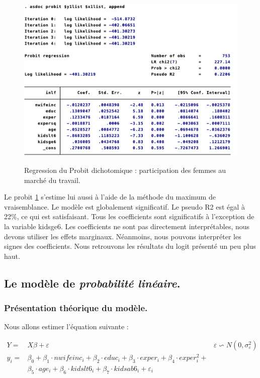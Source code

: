  \begin{figure}[h]
    \caption{Regression du Probit dichotomique : participation des femmes au marché du travail.}
    \includegraphics[scale = 0.8]{100_tab_results/probitdicho.png}
    \centering
    \label{reg:Probitdichotomique}
\end{figure}

 Le probit \ref{reg:Probitdichotomique} s’estime lui aussi à l’aide de la méthode du maximum de vraisemblance. Le modèle est globalement significatif. Le pseudo R2 est égal à 22\%, ce qui est satisfaisant. Tous les coefficients sont significatifs à l’exception de la variable kidsge6. Les coefficients ne sont pas directement interprétables, nous devons utiliser les effets marginaux. Néanmoins, nous pouvons interpréter les signes des coefficients. Nous retrouvons les résultats du logit présenté un peu plus haut.

 \subsection*{Le modèle de \emph{probabilité linéaire}.}

 \subsubsection*{Présentation théorique du modèle.}

 Nous allons estimer l'équation suivante : 
 
 \begin{align*}
     Y = & X \beta + \varepsilon  &  \varepsilon \backsim N(0,\sigma^2_{\varepsilon})  \nonumber \\
     y_i  = & \beta_0 + \beta_1 \cdot nwifeinc_i + \beta_2 \cdot  educ_i + \beta_3 \cdot exper_i + \beta_4 \cdot exper_i^2 + \nonumber \\ 
     & \beta_5 \cdot age_i + \beta_6 \cdot kidslt6_i + \beta_7 \cdot kidsab6_i + \varepsilon_i 
 \end{align*}

